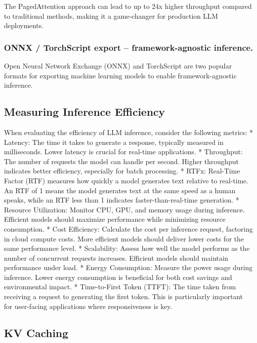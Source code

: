 \documentclass{article}
\begin{document}
The PagedAttention approach can lead to up to 24x higher throughput
compared to traditional methods, making it a game-changer for production
LLM deployments.

\subsubsection{ONNX / TorchScript export -- framework-agnostic
inference.}\label{onnx-torchscript-export-framework-agnostic-inference.}

Open Neural Network Exchange (ONNX) and TorchScript are two popular
formats for exporting machine learning models to enable
framework-agnostic inference.

\subsection{Measuring Inference
Efficiency}\label{measuring-inference-efficiency}

When evaluating the efficiency of LLM inference, consider the following
metrics: * Latency: The time it takes to generate a response, typically
measured in milliseconds. Lower latency is crucial for real-time
applications. * Throughput: The number of requests the model can handle
per second. Higher throughput indicates better efficiency, especially
for batch processing. * RTFx: Real-Time Factor (RTF) measures how
quickly a model generates text relative to real-time. An RTF of 1 means
the model generates text at the same speed as a human speaks, while an
RTF less than 1 indicates faster-than-real-time generation. * Resource
Utilization: Monitor CPU, GPU, and memory usage during inference.
Efficient models should maximize performance while minimizing resource
consumption. * Cost Efficiency: Calculate the cost per inference
request, factoring in cloud compute costs. More efficient models should
deliver lower costs for the same performance level. * Scalability:
Assess how well the model performs as the number of concurrent requests
increases. Efficient models should maintain performance under load. *
Energy Consumption: Measure the power usage during inference. Lower
energy consumption is beneficial for both cost savings and environmental
impact. * Time-to-First Token (TTFT): The time taken from receiving a
request to generating the first token. This is particularly important
for user-facing applications where responsiveness is key.

\subsection{KV Caching}\label{kv-caching}
\end{document}
